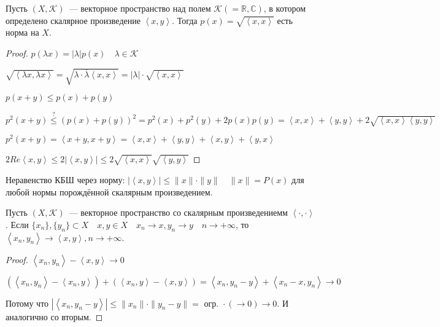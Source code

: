 \documentclass{book}
\newcommand\R{\ensuremath{\mathbb{R}}}
\renewcommand\C{\ensuremath{\mathbb{C}}}
\newcommand{\ov}[1]{\overline{#1}}
\theoremstyle{definition}
\begin{document}
    \begin{statement}
        Пусть $(X, \mathcal{K})$~--- векторное пространство над полем $\mathcal{K}( = \R, \C)$, в котором определено скалярное произведение $ \left< x, y \right>$. 
        Тогда $p(x) = \sqrt{\left< x, x \right>} $ есть норма на $X$.
    \end{statement}
    \begin{proof}
        $p(\lambda x) = |\lambda|p(x)\quad \lambda \in \mathcal{K}$

        $\sqrt{\left< \lambda x, \lambda x \right>} = \sqrt{\lambda \cdot  \ov{\lambda} \left< x, x \right>}  = |\lambda| \cdot \sqrt{\left< x, x \right>} $

        $p(x+y)\leqslant p(x) + p(y)$

        $p^2(x+y) \overset ? {\leqslant} (p(x) + p(y))^2 = p^2(x) + p^2(y) + 2p(x)p(y) = \left< x, x \right> + \left< y, y \right> + 2\sqrt{\left< x, x \right> \left< y, y \right>}$

        $p^2(x+y) = \left< x+y, x+y \right> = \left< x, x \right> + \left< y, y \right> + \left< x, y  \right> + \left< y, x \right>$

        $2 Re\left<x, y \right> \leqslant 2 \left| \left< x,y \right> \right| \leqslant 2\sqrt{\left< x, x \right>} \sqrt{\left< y, y \right>} $
    \end{proof}

    Неравенство КБШ через норму: $\left| \left< x, y \right> \right| \leqslant \|x\| \cdot \|y\|\quad \|x\| = P(x)$ для любой нормы порождённой скалярным произведением.

    \begin{statement}
        Пусть $\left( X, \mathcal{K} \right)$~--- векторное пространство со скалярным произведениемм $\left<\cdot , \cdot  \right>$. 
        Если  $\{x_{n} \}, \{y_{n} \} \subset X\quad x, y\in X\quad x_{n} \to x, y_{n} \to y\quad n \to  +\infty$, то  $\left<x_{n} , y_{n}  \right> \to \left< x, y \right>, n\to  +\infty$.
    \end{statement}
    \begin{proof}
        $\left< x_{n} , y_{n}  \right> - \left< x, y \right> \to 0$

        $\left( \left<x_{n} , y_{n}  \right> - \left<x_{n} , y \right> \right)  + \left( \left< x_{n} , y \right> - \left< x, y \right> \right)  = \left< x_{n} , y_{n} -y \right> + \left< x_{n} -x, y_{n}  \right> \to 0$

        Потому что $\left| \left< x_{n} , y_{n} -y \right> \right| \leqslant \|x_{n} \|\cdot \|y_{n} -y\| =  \text{ огр. } \cdot  (\to 0) \to 0$. И аналогично со вторым.
    \end{proof}
\end{document}
